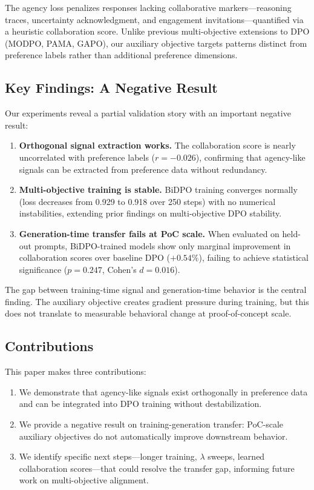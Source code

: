 The agency loss penalizes responses lacking collaborative markers---reasoning traces, uncertainty acknowledgment, and engagement invitations---quantified via a heuristic collaboration score. Unlike previous multi-objective extensions to DPO (MODPO, PAMA, GAPO), our auxiliary objective targets patterns distinct from preference labels rather than additional preference dimensions.

\subsection{Key Findings: A Negative Result}

Our experiments reveal a partial validation story with an important negative result:

\begin{enumerate}
\item \textbf{Orthogonal signal extraction works.} The collaboration score is nearly uncorrelated with preference labels ($r = -0.026$), confirming that agency-like signals can be extracted from preference data without redundancy.

\item \textbf{Multi-objective training is stable.} BiDPO training converges normally (loss decreases from 0.929 to 0.918 over 250 steps) with no numerical instabilities, extending prior findings on multi-objective DPO stability.

\item \textbf{Generation-time transfer fails at PoC scale.} When evaluated on held-out prompts, BiDPO-trained models show only marginal improvement in collaboration scores over baseline DPO ($+0.54\%$), failing to achieve statistical significance ($p = 0.247$, Cohen's $d = 0.016$).
\end{enumerate}

The gap between training-time signal and generation-time behavior is the central finding. The auxiliary objective creates gradient pressure during training, but this does not translate to measurable behavioral change at proof-of-concept scale.

\subsection{Contributions}

This paper makes three contributions:

\begin{enumerate}
\item We demonstrate that agency-like signals exist orthogonally in preference data and can be integrated into DPO training without destabilization.

\item We provide a negative result on training-generation transfer: PoC-scale auxiliary objectives do not automatically improve downstream behavior.

\item We identify specific next steps---longer training, $\lambda$ sweeps, learned collaboration scores---that could resolve the transfer gap, informing future work on multi-objective alignment.
\end{enumerate}
